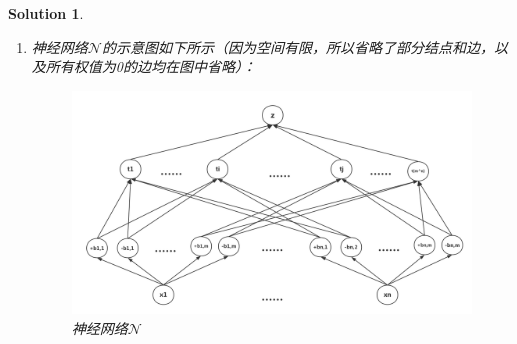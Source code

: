\documentclass[a4paper,UTF8]{article}
\numberwithin{equation}{section}
\newtheorem*{solution}{Solution}
\begin{document}
\begin{solution}

\begin{enumerate}[ {(}1{)}]
\item 神经网络$\mathcal{N}$的示意图如下所示（因为空间有限，所以省略了部分结点和边，以及所有权值为0的边均在图中省略）：
\begin{figure}[!h]
	\centering   
	\includegraphics[scale=0.3]{net.png}  
	\caption{神经网络$\mathcal{N}$} 
	\label{net}
\end{figure}	
	

\end{enumerate}
\end{solution}
\end{document}
